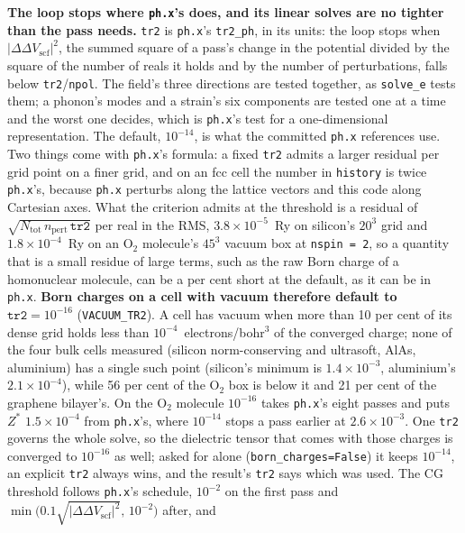 \documentclass[11pt,a4paper]{article}
\newcommand{\code}[1]{\texttt{\small #1}}
\begin{document}
\textbf{The loop stops where \code{ph.x}'s does, and its linear solves are no
tighter than the pass needs.} \code{tr2} is \code{ph.x}'s \code{tr2\_ph}, in its
units: the loop stops when $|\Delta\Delta V_{\mathrm{scf}}|^2$, the summed square
of a pass's change in the potential divided by the square of the number of reals
it holds and by the number of perturbations, falls below \code{tr2}/\code{npol}.
The field's three directions are tested together, as \code{solve\_e} tests them;
a phonon's modes and a strain's six components are tested one at a time and the
worst one decides, which is \code{ph.x}'s test for a one-dimensional
representation. The default, $10^{-14}$, is what the committed \code{ph.x}
references use. Two things come with \code{ph.x}'s formula: a fixed \code{tr2}
admits a larger residual per grid point on a finer grid, and on an fcc cell the
number in \code{history} is twice \code{ph.x}'s, because \code{ph.x} perturbs
along the lattice vectors and this code along Cartesian axes. What the criterion
admits at the threshold is a residual of $\sqrt{N_{\mathrm{tot}}\,n_{\mathrm{pert}}\,
\mathtt{tr2}}$ per real in the RMS, $3.8\times10^{-5}$~Ry on silicon's $20^3$ grid
and $1.8\times10^{-4}$~Ry on an O$_2$ molecule's $45^3$ vacuum box at
\code{nspin = 2}, so a quantity that is a small residue of large terms, such as
the raw Born charge of a homonuclear molecule, can be a per cent short at the
default, as it can be in \code{ph.x}. \textbf{Born charges on a cell with vacuum
therefore default to $\mathtt{tr2}=10^{-16}$} (\code{VACUUM\_TR2}). A cell has
vacuum when more than 10 per cent of its dense grid holds less than
$10^{-4}$~electrons/bohr$^3$ of the converged charge; none of the four bulk cells
measured (silicon norm-conserving and ultrasoft, AlAs, aluminium) has a single such
point (silicon's minimum is $1.4\times10^{-3}$, aluminium's
$2.1\times10^{-4}$), while 56 per cent of the O$_2$ box is below it and 21 per cent of
the graphene bilayer's. On the O$_2$ molecule $10^{-16}$ takes \code{ph.x}'s eight
passes and puts $Z^{\ast}$ $1.5\times10^{-4}$ from \code{ph.x}'s, where $10^{-14}$
stops a pass earlier at $2.6\times10^{-3}$. One \code{tr2} governs the whole solve,
so the dielectric tensor that comes with those charges is converged to $10^{-16}$
as well; asked for alone (\code{born\_charges=False}) it keeps $10^{-14}$, an
explicit \code{tr2} always wins, and the result's \code{tr2} says which was used.
The CG threshold
follows \code{ph.x}'s schedule, $10^{-2}$ on the first pass and
$\min\big(0.1\sqrt{|\Delta\Delta V_{\mathrm{scf}}|^2},\,10^{-2}\big)$ after, and
\end{document}
